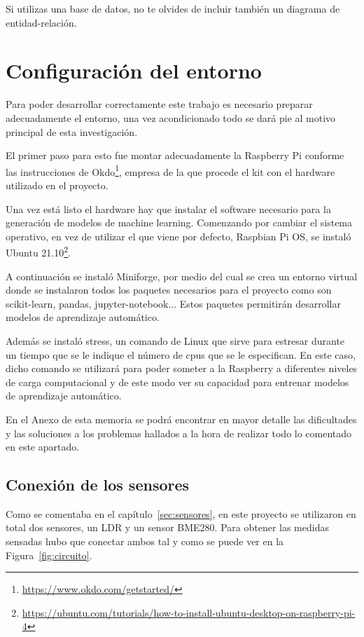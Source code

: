 \documentclass[a4paper, 12pt]{book}
\begin{document}
Si utilizas una base de datos, no te olvides de incluir también un diagrama de entidad-relación.


\section{Configuración del entorno}

Para poder desarrollar correctamente este trabajo es necesario preparar adecuadamente el entorno, una vez acondicionado todo se dará pie al motivo principal de esta investigación.

El primer paso para esto fue montar adecuadamente la Raspberry Pi conforme las instrucciones de Okdo\footnote{\url{https://www.okdo.com/getstarted/}}, empresa de la que procede el kit con el hardware utilizado en el proyecto.

Una vez está listo el hardware hay que instalar el software necesario para la generación de modelos de machine learning.
Comenzando por cambiar el sistema operativo, en vez de utilizar el que viene por defecto, Raspbian Pi OS, se instaló Ubuntu 21.10\footnote{\url{https://ubuntu.com/tutorials/how-to-install-ubuntu-desktop-on-raspberry-pi-4}}.

A continuación se instaló Miniforge, por medio del cual se crea un entorno virtual donde se instalaron todos los paquetes necesarios para el proyecto como son scikit-learn, pandas, jupyter-notebook... Estos paquetes permitirán desarrollar modelos de aprendizaje automático.

Además se instaló stress, un comando de Linux que sirve para estresar durante un tiempo que se le indique el número de cpus que se le especifican. En este caso, dicho comando se utilizará para poder someter a la Raspberry a diferentes niveles de carga computacional y de este modo ver su capacidad para entrenar modelos de aprendizaje automático. 

En el Anexo de esta memoria se podrá encontrar en mayor detalle las dificultades y las soluciones a los problemas hallados a la hora de realizar todo lo comentado en este apartado.


\subsection{Conexión de los sensores}
\label{subsec:conexion_sensores}

Como se comentaba en el capítulo~\ref{sec:sensores}, en este proyecto se utilizaron en total dos sensores, un LDR y un sensor BME280. Para obtener las medidas sensadas hubo que conectar ambos tal y como se puede ver en la Figura~\ref{fig:circuito}.
\end{document}
